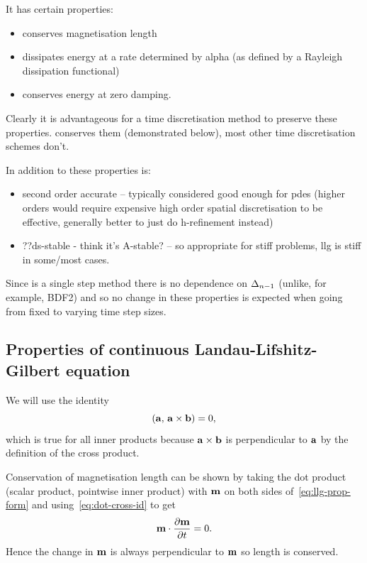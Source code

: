 It has certain properties:
\begin{itemize}
\item conserves magnetisation length
\item dissipates energy at a rate determined by alpha (as defined by a Rayleigh dissipation functional)
\item conserves energy at zero damping.
\end{itemize}

Clearly it is advantageous for a time discretisation method to preserve these properties.
\imr conserves them (demonstrated below), most other time discretisation schemes don't.

In addition to these properties \imr is:
\begin{itemize}
\item second order accurate -- typically considered good enough for pdes (higher orders would require expensive high order spatial discretisation to be effective, generally better to just do h-refinement instead) \cite{Matthias}
\item ??ds-stable - think it's A-stable? \cite{??ds} -- so appropriate for stiff problems, llg is stiff in some/most cases\cite{??ds}.
\end{itemize}

Since \imr is a single step method there is no dependence on $\Delta_{n-1}$ (unlike, for example, BDF2) and so no change in these properties is expected when going from fixed to varying time step sizes.

\subsection{Properties of continuous Landau-Lifshitz-Gilbert equation}
\label{sec:prop-cont-llg}

We will use the identity
\begin{equation}
  \label{eq:dot-cross-id}
  \left({\mathbf{a}},\, {\mathbf{a}} \times {\mathbf{b}} \right) = 0,
\end{equation}
which is true for all inner products because ${\mathbf{a}} \times {\mathbf{b}}$ is perpendicular to ${\mathbf{a}}$ by the definition of the cross product.

Conservation of magnetisation length can be shown by taking the dot product (scalar product, pointwise inner product) with $\mathbf{m}$ on both sides of~\eqref{eq:llg-prop-form} and using~\eqref{eq:dot-cross-id} to get
\begin{equation}
  \label{eq:56}
  \mathbf{m} \cdot \frac{\partial \mathbf{m}}{\partial t} = 0.
\end{equation}
Hence the change in $\mathbf{m}$ is always perpendicular to $\mathbf{m}$ so length is conserved.

